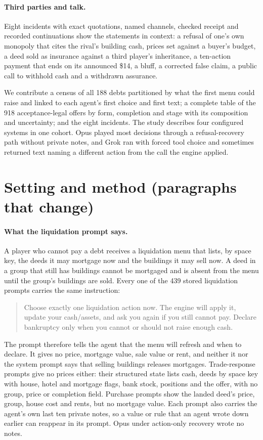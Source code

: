 \documentclass[11pt,letterpaper]{article}
\newenvironment{tq}{\begin{quote}\small}{\end{quote}}
\begin{document}
\paragraph{Third parties and talk.} Eight incidents with exact quotations, named channels, checked receipt and recorded continuations show the statements in context: a refusal of one's own monopoly that cites the rival's building cash, prices set against a buyer's budget, a deed sold as insurance against a third player's inheritance, a ten-action payment that ends on its announced \$14, a bluff, a corrected false claim, a public call to withhold cash and a withdrawn assurance.

We contribute a census of all 188 debts partitioned by what the first menu could raise and linked to each agent's first choice and first text; a complete table of the 918 acceptance-legal offers by form, completion and stage with its composition and uncertainty; and the eight incidents. The study describes four configured systems in one cohort. Opus played most decisions through a refusal-recovery path without private notes, and Grok ran with forced tool choice and sometimes returned text naming a different action from the call the engine applied.

\section{Setting and method (paragraphs that change)}

\paragraph{What the liquidation prompt says.} A player who cannot pay a debt receives a liquidation menu that lists, by space key, the deeds it may mortgage now and the buildings it may sell now. A deed in a group that still has buildings cannot be mortgaged and is absent from the menu until the group's buildings are sold. Every one of the 439 stored liquidation prompts carries the same instruction:
\begin{tq}\begin{minipage}{\linewidth}
Choose exactly one liquidation action now. The engine will apply it, update your cash/assets, and ask you again if you still cannot pay. Declare bankruptcy only when you cannot or should not raise enough cash.
\end{minipage}\end{tq}
The prompt therefore tells the agent that the menu will refresh and when to declare. It gives no price, mortgage value, sale value or rent, and neither it nor the system prompt says that selling buildings releases mortgages. Trade-response prompts give no prices either: their structured state lists cash, deeds by space key with house, hotel and mortgage flags, bank stock, positions and the offer, with no group, price or completion field. Purchase prompts show the landed deed's price, group, house cost and rents, but no mortgage value. Each prompt also carries the agent's own last ten private notes, so a value or rule that an agent wrote down earlier can reappear in its prompt. Opus under action-only recovery wrote no notes.
\end{document}
